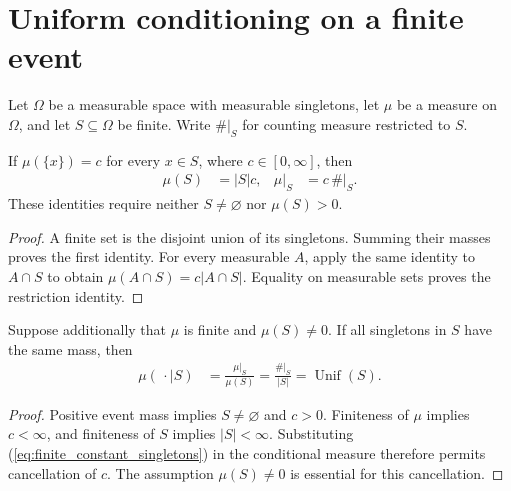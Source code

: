 \section{Uniform conditioning on a finite event}
\label{sec:finite_uniform_conditioning}

Let $\Omega$ be a measurable space with measurable singletons, let $\mu$
be a measure on $\Omega$, and let $S\subseteq\Omega$ be finite.
Write $\#|_S$ for counting measure restricted to $S$.

\begin{lemma}
\label{lem:finite_constant_singletons}
\leanok
If $\mu(\{x\})=c$ for every $x\in S$, where $c\in[0,\infty]$, then
\begin{align}
 \mu(S)&=|S|c,& \mu|_S&=c\,\#|_S.
 \label{eq:finite_constant_singletons}
\end{align}
These identities require neither $S\ne\varnothing$ nor $\mu(S)>0$.
\end{lemma}
\begin{proof}
\leanok
A finite set is the disjoint union of its singletons. Summing their masses
proves the first identity. For every measurable $A$, apply the same identity
to $A\cap S$ to obtain $\mu(A\cap S)=c|A\cap S|$.
Equality on measurable sets proves the restriction identity.
\end{proof}

\begin{theorem}
\label{thm:finite_uniform_conditioning}
\leanok
Suppose additionally that $\mu$ is finite and $\mu(S)\ne0$.
If all singletons in $S$ have the same mass, then
\begin{align}
 \mu(\,\cdot\mid S)
   &=\frac{\mu|_S}{\mu(S)}
    =\frac{\#|_S}{|S|}
    =\operatorname{Unif}(S).
 \label{eq:finite_uniform_conditioning}
\end{align}
\end{theorem}
\begin{proof}
\leanok
{}
Positive event mass implies $S\ne\varnothing$ and $c>0$.
Finiteness of $\mu$ implies $c<\infty$, and finiteness of $S$ implies
$|S|<\infty$. Substituting (\ref{eq:finite_constant_singletons}) in the
conditional measure therefore permits cancellation of $c$.
The assumption $\mu(S)\ne0$ is essential for this cancellation.
\end{proof}
